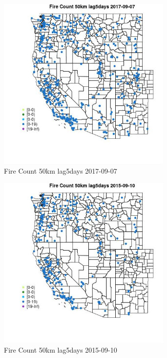 \begin{figure} 
\centering  
\includegraphics[width=0.77\textwidth]{Code_Outputs/Report_ML_input_PM25_Step4_part_e_de_duplicated_aves_compiled_2019-05-21wNAs_MapObsFire_Count_50km_lag5days2017-09-07.jpg} 
\caption{\label{fig:Report_ML_input_PM25_Step4_part_e_de_duplicated_aves_compiled_2019-05-21wNAsMapObsFire_Count_50km_lag5days2017-09-07}Fire Count 50km lag5days 2017-09-07} 
\end{figure} 
 

\begin{figure} 
\centering  
\includegraphics[width=0.77\textwidth]{Code_Outputs/Report_ML_input_PM25_Step4_part_e_de_duplicated_aves_compiled_2019-05-21wNAs_MapObsFire_Count_50km_lag5days2015-09-10.jpg} 
\caption{\label{fig:Report_ML_input_PM25_Step4_part_e_de_duplicated_aves_compiled_2019-05-21wNAsMapObsFire_Count_50km_lag5days2015-09-10}Fire Count 50km lag5days 2015-09-10} 
\end{figure} 
 

